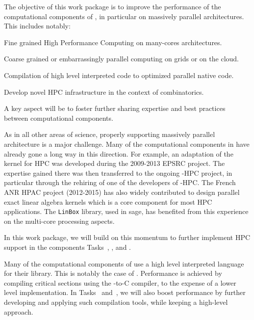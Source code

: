 \begin{workpackage}[id=hpc,wphases=36-48,
  title=High Performance Computing,
  PSRM=1, %
  LLRM=12, %
  SARM=1, %
  UKRM=1, %
  UBRM=1, %
  UJFRM=12] %
  
\begin{wpobjectives}
  The objective of this work package is to improve the performance of
  the computational components of \TheProject, in particular on
  massively parallel architectures. This includes notably:
  \begin{compactitem}
  \item Fine grained High Performance Computing on many-cores architectures.
  \item Coarse grained or embarrassingly parallel computing on grids or on the cloud.
  \item Compilation of high level interpreted code to optimized parallel native code.
  \item Develop novel HPC infrastructure in the context of combinatorics.
  \end{compactitem}
  A key aspect will be to foster further sharing expertise and best
  practices between computational components.
\end{wpobjectives}

\begin{wpdescription}
  As in all other areas of science, properly supporting massively
  parallel architecture is a major challenge. Many of the
  computational components in \TheProject have already gone a long way
  in this direction. For example, an adaptation of the \GAP kernel for
  HPC was developed during the 2009-2013 EPSRC project. The expertise
  gained there was then transferred to the ongoing \Singular-HPC
  project, in particular through the rehiring of one of the developers
  of \GAP-HPC. The French ANR HPAC project (2012-2015) has also widely contributed to design
  parallel exact linear algebra kernels  which is a core component for most HPC
  applications. The \texttt{LinBox} library, used in sage, has benefited from this
  experience on the multi-core processing aspects. 

  In this work package, we will build on this momentum to further
  implement HPC support in the components Tasks~,
  , and .


  Many of the computational components of \TheProject use a high level
  interpreted language for their library. This is notably the case of
  \Sage. Performance is achieved by compiling critical sections using
  the \Cython \Python-to-C compiler, to the expense of a lower level
  implementation. In Tasks~
  and~, we will also boost performance by
  further developing and applying such compilation tools, while
  keeping a high-level approach.


\end{wpdescription}
\end{workpackage}
